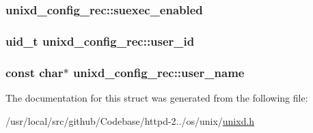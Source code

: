 \subsubsection[{\texorpdfstring{suexec\+\_\+enabled}{suexec_enabled}}]{ unixd\+\_\+config\+\_\+rec\+::suexec\+\_\+enabled}\hypertarget{structunixd__config__rec_ad1e0300695719bb0925a9e271e5c3d10}{}\label{structunixd__config__rec_ad1e0300695719bb0925a9e271e5c3d10}
\subsubsection[{\texorpdfstring{user\+\_\+id}{user_id}}]{\setlength{\rightskip}{0pt plus 5cm}uid\+\_\+t unixd\+\_\+config\+\_\+rec\+::user\+\_\+id}\hypertarget{structunixd__config__rec_a5a0cb8ffa8a7a2a7f74004988a516280}{}\label{structunixd__config__rec_a5a0cb8ffa8a7a2a7f74004988a516280}
\subsubsection[{\texorpdfstring{user\+\_\+name}{user_name}}]{\setlength{\rightskip}{0pt plus 5cm}const char$\ast$ unixd\+\_\+config\+\_\+rec\+::user\+\_\+name}\hypertarget{structunixd__config__rec_a9ad5824ad485ab8146926b852a4ba31b}{}\label{structunixd__config__rec_a9ad5824ad485ab8146926b852a4ba31b}


The documentation for this struct was generated from the following file\+:\begin{DoxyCompactItemize}
\item 
/usr/local/src/github/\+Codebase/httpd-\/2../os/unix/\hyperlink{unixd_8h}{unixd.\+h}\end{DoxyCompactItemize}
